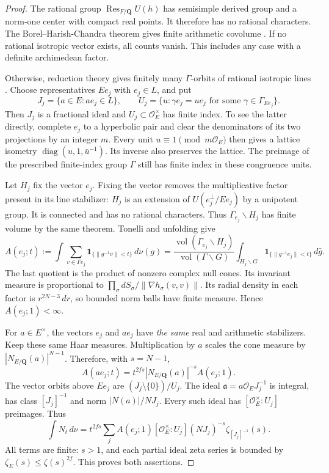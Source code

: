 \begin{proof}
The rational group $\operatorname{Res}_{F/\mathbf Q}U(h)$ has
semisimple derived group and a norm-one center with compact real
points. It therefore has no rational characters. The
Borel--Harish-Chandra theorem gives finite arithmetic covolume
\cite{arithmetic-borel-harish-chandra}. If no rational isotropic
vector exists, all counts vanish. This includes any case with a
definite archimedean factor.

Otherwise, reduction theory gives finitely many $\Gamma$-orbits
of rational isotropic lines \cite{arithmetic-platonov-rapinchuk}.
Choose representatives $Ee_j$ with $e_j\in L$, and put
\[
 J_j=\{a\in E:ae_j\in L\},\qquad
 U_j=\{u:\gamma e_j=ue_j\text{ for some }\gamma\in\Gamma_{Ee_j}\}.
\]
Then $J_j$ is a fractional ideal and $U_j\subset\mathcal O_E^\times$
has finite index. To see the latter directly, complete $e_j$ to a
hyperbolic pair and clear the denominators of its two projections by
an integer $m$. Every unit $u\equiv1\pmod{m\mathcal O_E}$ then
gives a lattice isometry
$\operatorname{diag}(u,1,\bar u^{-1})$. Its inverse also preserves
the lattice. The preimage of the prescribed finite-index group
$\Gamma$ still has finite index in these congruence units.

Let $H_j$ fix the vector $e_j$. Fixing the vector removes the
multiplicative factor present in its line stabilizer: $H_j$ is an
extension of $U(e_j^\perp/Ee_j)$ by a unipotent group. It is
connected and has no rational characters. Thus
$\Gamma_{e_j}\backslash H_j$ has finite volume by the same theorem.
Tonelli and unfolding give
\[
 A(e_j;t):=\int\sum_{v\in\Gamma e_j}
           \mathbf1_{\{\|g^{-1}v\|<t\}}\,d\nu(g)
 =\frac{\operatorname{vol}(\Gamma_{e_j}\backslash H_j)}
        {\operatorname{vol}(\Gamma\backslash G)}
   \int_{H_j\backslash G}\mathbf1_{\{\|g^{-1}e_j\|<t\}}\,d\bar g.
\]
The last quotient is the product of nonzero complex null cones.
Its invariant measure is proportional to
$\prod_\sigma dS_\sigma/\|\nabla h_\sigma(v,v)\|$.
Its radial density in each factor is $r^{2N-3}\,dr$, so bounded
norm balls have finite measure. Hence $A(e_j;1)<\infty$.

For $a\in E^\times$, the vectors $e_j$ and $ae_j$ have
\emph{the same} real and arithmetic stabilizers. Keep these same
Haar measures. Multiplication by $a$ scales the cone measure by
$|N_{E/\mathbf Q}(a)|^{N-1}$. Therefore, with $s=N-1$,
\[
 A(ae_j;t)=t^{2fs}|N_{E/\mathbf Q}(a)|^{-s}A(e_j;1).
\]
The vector orbits above $Ee_j$ are $(J_j\setminus\{0\})/U_j$.
The ideal $\mathfrak a=a\mathcal O_EJ_j^{-1}$ is integral, has
class $[J_j]^{-1}$ and norm $|N(a)|/NJ_j$. Every such ideal has
$[\mathcal O_E^\times:U_j]$ preimages. Thus
\[
 \int N_t\,d\nu
 =t^{2fs}\sum_j A(e_j;1)[\mathcal O_E^\times:U_j]
           (NJ_j)^{-s}\zeta_{[J_j]^{-1}}(s).
\]
All terms are finite: $s>1$, and each partial ideal zeta series is
bounded by $\zeta_E(s)\le\zeta(s)^{2f}$. This proves both assertions.


\end{proof}
